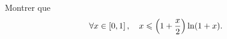 \documentclass{magnolia}
\begin{document}
\begin{exoUnique}
\exo Montrer que
  \[\forall x\in\left[0,1\right],\quad x\leqslant \left(1+\frac{x}{2}\right)\ln(1+x).\]
\end{exoUnique}
\end{document}
